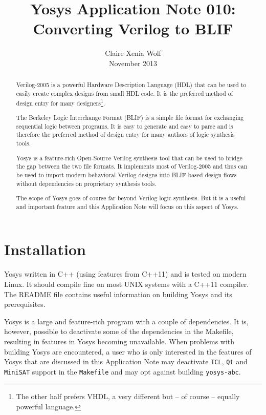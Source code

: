 \documentclass[9pt,technote,a4paper]{IEEEtran}
\begin{document}
\title{Yosys Application Note 010: \\ Converting Verilog to BLIF}
\author{Claire Xenia Wolf \\ November 2013}
\maketitle

\begin{abstract}
Verilog-2005 is a powerful Hardware Description Language (HDL) that can be used
to easily create complex designs from small HDL code. It is the preferred
method of design entry for many designers\footnote{The other half prefers VHDL,
a very different but -- of course -- equally powerful language.}.

The Berkeley Logic Interchange Format (BLIF) \cite{blif} is a simple file format for
exchanging sequential logic between programs. It is easy to generate and
easy to parse and is therefore the preferred method of design entry for
many authors of logic synthesis tools.

Yosys \cite{yosys} is a feature-rich
Open-Source Verilog synthesis tool that can be used to bridge the gap between
the two file formats. It implements most of Verilog-2005 and thus can be used
to import modern behavioral Verilog designs into BLIF-based design flows
without dependencies on proprietary synthesis tools.

The scope of Yosys goes of course far beyond Verilog logic synthesis. But
it is a useful and important feature and this Application Note will focus
on this aspect of Yosys.
\end{abstract}

\section{Installation}

Yosys written in C++ (using features from C++11) and is tested on modern Linux.
It should compile fine on most UNIX systems with a C++11 compiler. The README
file contains useful information on building Yosys and its prerequisites.

Yosys is a large and feature-rich program with a couple of dependencies. It is,
however, possible to deactivate some of the dependencies in the Makefile,
resulting in features in Yosys becoming unavailable. When problems with building
Yosys are encountered, a user who is only interested in the features of Yosys
that are discussed in this Application Note may deactivate {\tt TCL}, {\tt Qt}
and {\tt MiniSAT} support in the {\tt Makefile} and may opt against building
{\tt yosys-abc}.
\end{document}
